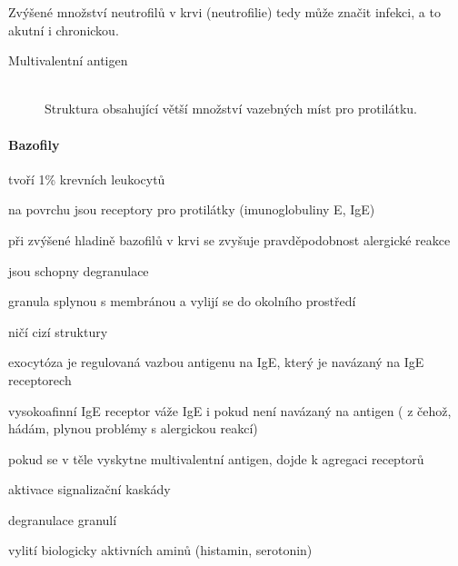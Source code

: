 \documentclass[DIV=8]{scrreprt}
\begin{document}
Zvýšené množství neutrofilů v krvi (neutrofilie) tedy může značit infekci, a to akutní i chronickou.

\begin{description}
\item[Multivalentní antigen]\hfill \\
Struktura obsahující větší množství vazebných míst pro protilátku.

\end{description}


\paragraph{Bazofily}
\begin{myItemize}[nosep]
    \item tvoří 1\% krevních leukocytů
    \item na povrchu jsou receptory pro protilátky (imunoglobuliny E, IgE)
    \item při zvýšené hladině bazofilů v krvi se zvyšuje pravděpodobnost alergické reakce
    \item jsou schopny degranulace
\begin{myItemize}[nosep]
    \item granula splynou s membránou a vylijí se do okolního prostředí
    \item ničí cizí struktury
\end{myItemize}

    \item exocytóza je regulovaná vazbou antigenu na IgE, který je navázaný na IgE receptorech
\begin{myItemize}[nosep]
    \item vysokoafinní IgE receptor váže IgE i pokud není navázaný na antigen ( z čehož, hádám, plynou problémy s alergickou reakcí)
\end{myItemize}

    \item pokud se v těle vyskytne multivalentní antigen, dojde k agregaci receptorů
\begin{myEnumerate}[nosep]
    \item aktivace signalizační kaskády
    \item degranulace granulí
    \item vylití biologicky aktivních aminů (histamin, serotonin)
\end{myEnumerate}

\end{myItemize}
\end{document}
